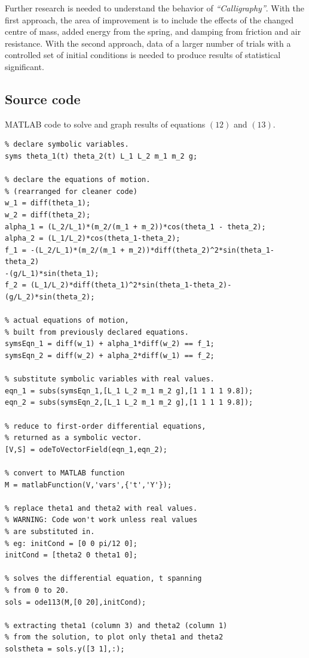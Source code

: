 \documentclass[a4paper,12pt]{article}
\begin{document}
Further research is needed to understand the behavior of \textit{“Calligraphy”}. With the first approach, the area of improvement is to include the effects of the changed centre of mass, added energy from the spring, and damping from friction and air resistance. With the second approach, data of a larger number of trials with a controlled set of initial conditions is needed to produce results of statistical significant.
\pagebreak
\printbibliography
\clearpage
{}
\begin{appendices}
    \section{Source code}
        MATLAB code to solve and graph results of equations $(12)$ and $(13)$.
        \begin{verbatim}
% declare symbolic variables.
syms theta_1(t) theta_2(t) L_1 L_2 m_1 m_2 g;

% declare the equations of motion.
% (rearranged for cleaner code)
w_1 = diff(theta_1);
w_2 = diff(theta_2);
alpha_1 = (L_2/L_1)*(m_2/(m_1 + m_2))*cos(theta_1 - theta_2);
alpha_2 = (L_1/L_2)*cos(theta_1-theta_2);
f_1 = -(L_2/L_1)*(m_2/(m_1 + m_2))*diff(theta_2)^2*sin(theta_1-theta_2)
-(g/L_1)*sin(theta_1);
f_2 = (L_1/L_2)*diff(theta_1)^2*sin(theta_1-theta_2)-(g/L_2)*sin(theta_2);

% actual equations of motion,
% built from previously declared equations.
symsEqn_1 = diff(w_1) + alpha_1*diff(w_2) == f_1;
symsEqn_2 = diff(w_2) + alpha_2*diff(w_1) == f_2;

% substitute symbolic variables with real values.
eqn_1 = subs(symsEqn_1,[L_1 L_2 m_1 m_2 g],[1 1 1 1 9.8]);
eqn_2 = subs(symsEqn_2,[L_1 L_2 m_1 m_2 g],[1 1 1 1 9.8]);

% reduce to first-order differential equations,
% returned as a symbolic vector.
[V,S] = odeToVectorField(eqn_1,eqn_2);

% convert to MATLAB function
M = matlabFunction(V,'vars',{'t','Y'});

% replace theta1 and theta2 with real values.
% WARNING: Code won't work unless real values
% are substituted in.
% eg: initCond = [0 0 pi/12 0];
initCond = [theta2 0 theta1 0];

% solves the differential equation, t spanning
% from 0 to 20.
sols = ode113(M,[0 20],initCond);

% extracting theta1 (column 3) and theta2 (column 1)
% from the solution, to plot only theta1 and theta2
solstheta = sols.y([3 1],:);


\end{verbatim}
\end{appendices}
\end{document}

